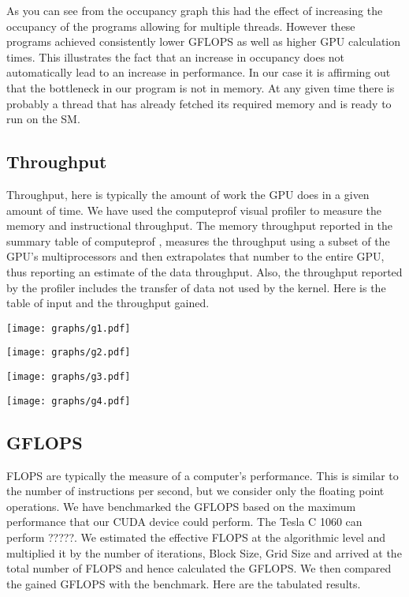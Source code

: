 \documentclass[10pt]{article}
\makeatletter
\newenvironment{figurehere}
{\def\@captype{figure}}
{}
\makeatother
\begin{document}
\begin{multicols}{2}
  As you can see from the occupancy graph this had the effect of increasing the occupancy of the programs allowing for multiple threads.
  However these programs achieved consistently lower GFLOPS as well as higher GPU calculation times.
  This illustrates the fact that an increase in occupancy does not automatically lead to an increase in performance.
  In our case it is affirming out that the bottleneck in our program is not in memory.
  At any given time there is probably a thread that has already fetched its required memory and is ready to run on the SM.

  \subsection{Throughput}
  Throughput, here is typically the amount of work the GPU does in a given amount of time.
  We have used the computeprof visual profiler to measure the memory and instructional throughput.
  The memory throughput reported in the summary table of computeprof ,  measures  the throughput using a subset of the GPU’s multiprocessors and then extrapolates that number to the entire GPU, thus reporting an estimate of the data throughput.
  Also, the throughput reported by the profiler includes the transfer of data not used by the kernel.
  Here is the table of input and the throughput gained.

  \begin{figurehere}
    \centering
    \texttt{[image: graphs/g1.pdf]}
    \caption{}
    \label{fig:jacobi_instr_throughput}
  \end{figurehere}

  \begin{figurehere}
    \centering
    \texttt{[image: graphs/g2.pdf]}
    \caption{}
    \label{fig:reduction_instr_throughput}
  \end{figurehere}

  \begin{figurehere}
    \centering
    \texttt{[image: graphs/g3.pdf]}
    \caption{}
    \label{fig:jacobi_mem_throughput}
  \end{figurehere}

  \begin{figurehere}
    \centering
    \texttt{[image: graphs/g4.pdf]}
    \caption{}
    \label{fig:reduction_mem_throughput}
  \end{figurehere}
  \subsection{GFLOPS}
  FLOPS are typically the measure of a computer’s performance.
  This is similar to the number of instructions per second, but we consider only the floating point operations.
  We have benchmarked the GFLOPS based on the maximum performance that our CUDA device could perform.
  The Tesla C 1060 can perform ?????.
  We estimated the effective FLOPS at the algorithmic level and multiplied it by the number of iterations, Block Size, Grid Size and arrived at the total number of FLOPS and hence calculated the GFLOPS.
  We then compared the gained GFLOPS with the benchmark.
  Here are the tabulated results.


\end{multicols}
\end{document}
